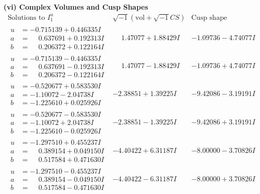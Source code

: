 \documentclass[1p]{elsarticle_modified}
\theoremstyle{definition}
\newcommand{\I}{\sqrt{-1}}
\begin{document}
\newpage\flushleft \textbf{(vi) Complex Volumes and Cusp Shapes}
$$\begin{array}{c|c|c}  
\text{Solutions to }I^u_{1}& \I (\text{vol} + \sqrt{-1}CS) & \text{Cusp shape}\\
 \hline 
\begin{aligned}
u &= -0.715139 + 0.446335 I \\
a &= \phantom{-}0.637691 + 0.192313 I \\
b &= \phantom{-}0.206372 + 0.122164 I\end{aligned}
 & \phantom{-}1.47077 + 1.88429 I & -1.09736 - 4.74077 I \\ \hline\begin{aligned}
u &= -0.715139 - 0.446335 I \\
a &= \phantom{-}0.637691 - 0.192313 I \\
b &= \phantom{-}0.206372 - 0.122164 I\end{aligned}
 & \phantom{-}1.47077 - 1.88429 I & -1.09736 + 4.74077 I \\ \hline\begin{aligned}
u &= -0.520677 + 0.583530 I \\
a &= -1.10072 - 2.04738 I \\
b &= -1.225610 + 0.025926 I\end{aligned}
 & -2.38851 + 1.39225 I & -9.42086 - 3.19191 I \\ \hline\begin{aligned}
u &= -0.520677 - 0.583530 I \\
a &= -1.10072 + 2.04738 I \\
b &= -1.225610 - 0.025926 I\end{aligned}
 & -2.38851 - 1.39225 I & -9.42086 + 3.19191 I \\ \hline\begin{aligned}
u &= -1.297510 + 0.455237 I \\
a &= \phantom{-}0.389154 + 0.049150 I \\
b &= \phantom{-}0.517584 + 0.471630 I\end{aligned}
 & -4.40422 + 6.31187 I & -8.00000 - 3.70826 I \\ \hline\begin{aligned}
u &= -1.297510 - 0.455237 I \\
a &= \phantom{-}0.389154 - 0.049150 I \\
b &= \phantom{-}0.517584 - 0.471630 I\end{aligned}
 & -4.40422 - 6.31187 I & -8.00000 + 3.70826 I \\ \hline\begin{aligned}

\end{aligned}
\end{array}$$
\end{document}
